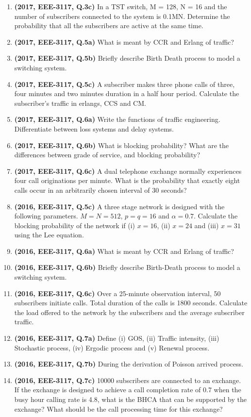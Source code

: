 \documentclass[12pt, a4paper]{article}
\begin{document}
\begin{enumerate}
		\item \textbf{(2017, EEE-3117, Q.3c)} In a TST switch, M = 128, N = 16 and the number of subscribers connected to the system is 0.1MN. Determine the probability that all the subscribers are active at the same time.
		\item \textbf{(2017, EEE-3117, Q.5a)} What is meant by CCR and Erlang of traffic?
		\item \textbf{(2017, EEE-3117, Q.5b)} Briefly describe Birth Death process to model a switching system.
		\item \textbf{(2017, EEE-3117, Q.5c)} A subscriber makes three phone calls of three, four minutes and two minutes duration in a half hour period. Calculate the subscriber's traffic in erlangs, CCS and CM.
		\item \textbf{(2017, EEE-3117, Q.6a)} Write the functions of traffic engineering. Differentiate between loss systems and delay systems.
		\item \textbf{(2017, EEE-3117, Q.6b)} What is blocking probability? What are the differences between grade of service, and blocking probability?
		\item \textbf{(2017, EEE-3117, Q.6c)} A dual telephone exchange normally experiences four call originations per minute. What is the probability that exactly eight calls occur in an arbitrarily chosen interval of 30 seconds?
		
		\item \textbf{(2016, EEE-3117, Q.5c)} A three stage network is designed with the following parameters. $M=N=512$, $p=q=16$ and $\alpha=0.7$. Calculate the blocking probability of the network if (i) $x=16$, (ii) $x=24$ and (iii) $x=31$ using the Lee equation.
		\item \textbf{(2016, EEE-3117, Q.6a)} What is meant by CCR and Erlang of traffic?
		\item \textbf{(2016, EEE-3117, Q.6b)} Briefly describe Birth-Death process to model a switching system.
		\item \textbf{(2016, EEE-3117, Q.6c)} Over a 25-minute observation interval, 50 subscribers initiate calls. Total duration of the calls is 1800 seconds. Calculate the load offered to the network by the subscribers and the average subscriber traffic.
		\item \textbf{(2016, EEE-3117, Q.7a)} Define (i) GOS, (ii) Traffic intensity, (iii) Stochastic process, (iv) Ergodic process and (v) Renewal process.
		\item \textbf{(2016, EEE-3117, Q.7b)} During the derivation of Poisson arrived process.
		\item \textbf{(2016, EEE-3117, Q.7c)} 10000 subscribers are connected to an exchange. If the exchange is designed to achieve a call completion rate of 0.7 when the busy hour calling rate is 4.8, what is the BHCA that can be supported by the exchange? What should be the call processing time for this exchange?
	\end{enumerate}
	
\end{document}
